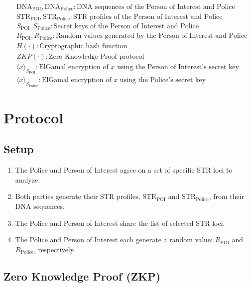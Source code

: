 \documentclass{article}
\begin{document}
\begin{align*}
    &\text{DNA}_{\text{POI}}, \text{DNA}_{\text{Police}}: \text{DNA sequences of the Person of Interest and Police} \\
    &\text{STR}_{\text{POI}}, \text{STR}_{\text{Police}}: \text{STR profiles of the Person of Interest and Police} \\
    &S_{\text{POI}}, S_{\text{Police}}: \text{Secret keys of the Person of Interest and Police} \\
    &R_{\text{POI}}, R_{\text{Police}}: \text{Random values generated by the Person of Interest and Police} \\
    &H(\cdot): \text{Cryptographic hash function} \\
    &ZKP(\cdot): \text{Zero Knowledge Proof protocol} \\
    &\langle x \rangle_{S_{\text{POI}}}: \text{ElGamal encryption of $x$ using the Person of Interest's secret key} \\
    &\langle x \rangle_{S_{\text{Police}}}: \text{ElGamal encryption of $x$ using the Police's secret key}
\end{align*}

\section{Protocol}

\subsection{Setup}

\begin{enumerate}
    \item The Police and Person of Interest agree on a set of specific STR loci to analyze.
    \item Both parties generate their STR profiles, $\text{STR}_{\text{POI}}$ and $\text{STR}_{\text{Police}}$, from their DNA sequences.
    \item The Police and Person of Interest share the list of selected STR loci.
    \item The Police and Person of Interest each generate a random value: $R_{\text{POI}}$ and $R_{\text{Police}}$, respectively.
\end{enumerate}

\subsection{Zero Knowledge Proof (ZKP)}
\end{document}
